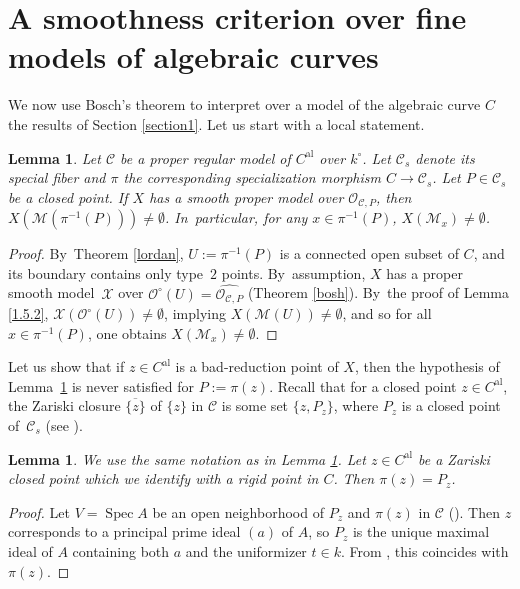 \documentclass[JEP,XML,SOM,Unicode,NoFloatCountersInSection,published]{cedram}
\newcommand{\al}{\mathrm{al}}
\DeclareMathOperator{\Spec}{Spec}
\newtheorem{lm}[thm]{Lemma}
\theoremstyle{definition}
\begin{document}
\section{A smoothness criterion over fine models of algebraic curves} \label{seksioni2}
We now use Bosch's theorem to interpret over a model of the algebraic curve $C$ the results of Section \ref{section1}. Let us start with a local statement.

\begin{lm} \label{2.1} Let $\mathcal{C}$ be a proper regular model of $C^{\al}$ over $k^{\circ}$. Let $\mathcal{C}_s$ denote its special fiber and $\pi$ the corresponding specialization morphism $C \to \mathcal{C}_s$.
Let $P \in \mathcal{C}_s$ be a closed point. If $X$ has a smooth proper model over $\mathcal{O}_{\mathcal{C}, P}$, then $X(\mathscr{M}(\pi^{-1}(P))) \neq \emptyset$. In~particular, for any $x \in \pi^{-1}(P)$, $X(\mathscr{M}_x) \neq \emptyset$.
\end{lm}

\begin{proof}
By~Theorem \ref{lordan}, $U:=\pi^{-1}(P)$ is a connected open subset of $C$, and its boundary contains only type~$2$ points. By~assumption, $X$ has a proper smooth model~$\mathcal{X}$ over $\mathcal{O}^{\circ}(U)=\widehat{\mathcal{O}_{\mathcal{C}, P}}$ (Theorem \ref{bosh}). By~the proof of Lemma \ref{1.5.2}, $\mathcal{X}(\mathcal{O}^{\circ}(U)) \neq \emptyset$, implying $X(\mathscr{M}(U)) \neq \emptyset$, and so for all $x \in \pi^{-1}(P)$, one obtains $X(\mathscr{M}_x) \neq \emptyset$.
\end{proof}

Let us show that if $z \in C^{\al}$ is a bad-reduction point of $X$, then the hypothesis of Lemma~\ref{2.1} is never satisfied for $P:=\pi(z)$. Recall that for a closed point $z \in C^{\al}$, the Zariski closure $\overline{\{z\}}$ of $\{z\}$ in $\mathcal{C}$ is some set $\{z, P_z\}$, where $P_z$ is a closed point of~$\mathcal{C}_s$ (see \cite[Def.\,10.1.31]{liulibri}).

\begin{lm} \label{2.2} We use the same notation as in Lemma \ref{2.1}.
Let $z \in C^{\al}$ be a Zariski closed point which we identify with a rigid point in $C$. Then ${\pi(z)=P_z}$.
\end{lm}

\begin{proof}
Let $V=\Spec A$ be an open neighborhood of $P_z$ and $\pi(z)$ in $\mathcal{C}$ (\cf \cite[2.2]{gabber}). Then $z$ corresponds to a principal prime ideal $(a)$ of $A$, so $P_z$ is the unique maximal ideal of $A$ containing both $a$ and the uniformizer $t \in k$.
From \cite[7.1.10]{dejong}, this coincides with $\pi(z)$.
\end{proof}
\end{document}
